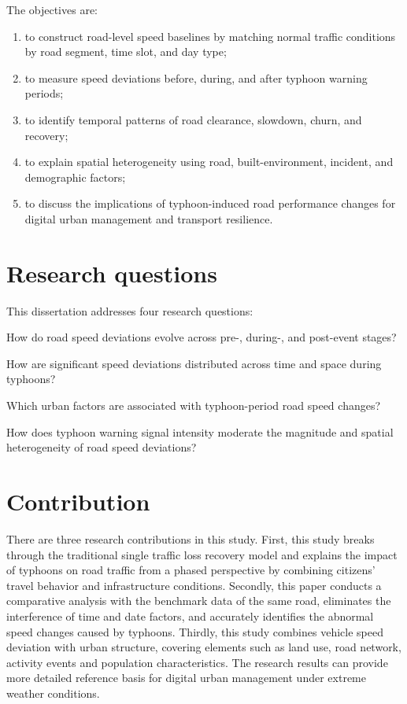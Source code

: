 \documentclass[12pt,a4paper]{report}
\begin{document}
The objectives are:
\begin{enumerate}[label=\arabic*.]
  \item to construct road-level speed baselines by matching normal traffic conditions by road segment, time slot, and day type;
  \item to measure speed deviations before, during, and after typhoon warning periods;
  \item to identify temporal patterns of road clearance, slowdown, churn, and recovery;
  \item to explain spatial heterogeneity using road, built-environment, incident, and demographic factors;
  \item to discuss the implications of typhoon-induced road performance changes for digital urban management and transport resilience.
\end{enumerate}

\section{Research questions}
This dissertation addresses four research questions:
\begin{description}[leftmargin=2.2cm,style=nextline]
  \item[RQ1] How do road speed deviations evolve across pre-, during-, and post-event stages?
  \item[RQ2] How are significant speed deviations distributed across time and space during typhoons?
  \item[RQ3] Which urban factors are associated with typhoon-period road speed changes?
  \item[RQ4] How does typhoon warning signal intensity moderate the magnitude and spatial heterogeneity of road speed deviations?
\end{description}

\section{Contribution}
There are three research contributions in this study. First, this study breaks through the traditional single traffic loss recovery model and explains the impact of typhoons on road traffic from a phased perspective by combining citizens' travel behavior and infrastructure conditions. Secondly, this paper conducts a comparative analysis with the benchmark data of the same road, eliminates the interference of time and date factors, and accurately identifies the abnormal speed changes caused by typhoons. Thirdly, this study combines vehicle speed deviation with urban structure, covering elements such as land use, road network, activity events and population characteristics. The research results can provide more detailed reference basis for digital urban management under extreme weather conditions.
\end{document}

